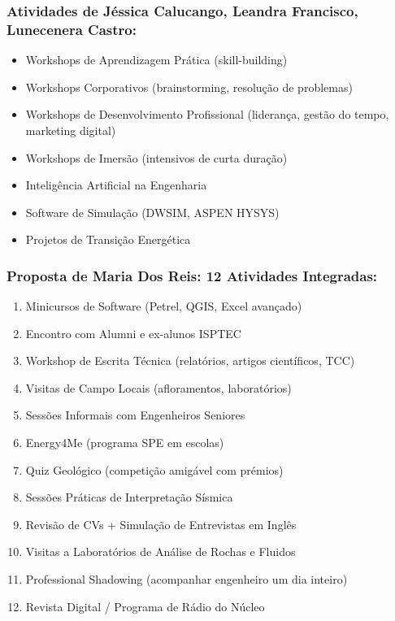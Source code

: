 \documentclass[12pt,a4paper]{article}
\begin{document}
\subsubsection*{Atividades de Jéssica Calucango, Leandra Francisco, Lunecenera Castro:}

\begin{itemize}[itemsep=0.15cm]
    \item Workshops de Aprendizagem Prática (skill-building)
    \item Workshops Corporativos (brainstorming, resolução de problemas)
    \item Workshops de Desenvolvimento Profissional (liderança, gestão do tempo, marketing digital)
    \item Workshops de Imersão (intensivos de curta duração)
    \item Inteligência Artificial na Engenharia
    \item Software de Simulação (DWSIM, ASPEN HYSYS)
    \item Projetos de Transição Energética
\end{itemize}

\subsubsection*{Proposta de Maria Dos Reis: 12 Atividades Integradas:}

\begin{enumerate}[itemsep=0.1cm]
    \item Minicursos de Software (Petrel, QGIS, Excel avançado)
    \item Encontro com Alumni e ex-alunos ISPTEC
    \item Workshop de Escrita Técnica (relatórios, artigos científicos, TCC)
    \item Visitas de Campo Locais (afloramentos, laboratórios)
    \item Sessões Informais com Engenheiros Seniores
    \item Energy4Me (programa SPE em escolas)
    \item Quiz Geológico (competição amigável com prémios)
    \item Sessões Práticas de Interpretação Sísmica
    \item Revisão de CVs + Simulação de Entrevistas em Inglês
    \item Visitas a Laboratórios de Análise de Rochas e Fluidos
    \item Professional Shadowing (acompanhar engenheiro um dia inteiro)
    \item Revista Digital / Programa de Rádio do Núcleo
\end{enumerate}
\end{document}
